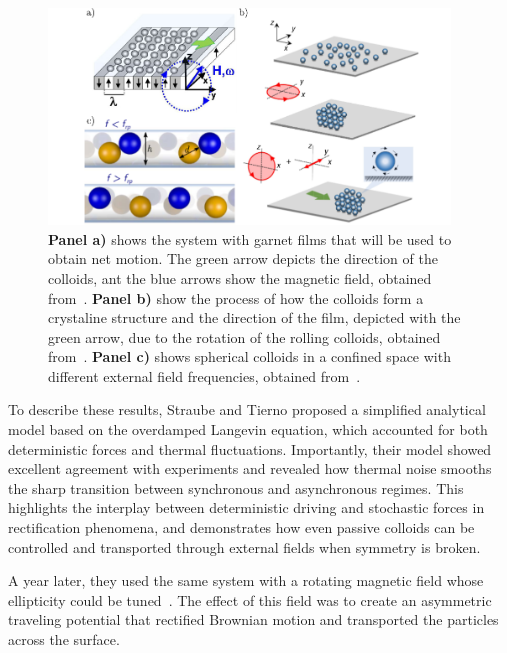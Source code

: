 \begin{figure}
  \begin{center}
    \includegraphics[width=0.95\textwidth]{figures/magneticallydrivencolloids.pdf}
  \end{center}
  \caption[Magnetically driven colloids examples.]{\textbf{Panel a)} shows the system with garnet films that will be used to obtain net motion. The green arrow depicts the direction of the colloids, ant the blue arrows show the magnetic field, obtained from~\cite{tierno2012depinning}. \textbf{Panel b)} show the process of how the colloids form a crystaline structure and the direction of the film, depicted with the green arrow, due to the rotation of the rolling colloids, obtained from~\cite{massana2019tunable}. \textbf{Panel c)} shows spherical colloids in a confined space with different external field frequencies, obtained from~\cite{massana2020emergent}.}\label{fig:magneticallydrivencolloidalsystems}
\end{figure}


To describe these results, Straube and Tierno proposed a simplified analytical model based on the overdamped Langevin equation, which accounted for both deterministic forces and thermal fluctuations. Importantly, their model showed excellent agreement with experiments and revealed how thermal noise smooths the sharp transition between synchronous and asynchronous regimes. This highlights the interplay between deterministic driving and stochastic forces in rectification phenomena, and demonstrates how even passive colloids can be controlled and transported through external fields when symmetry is broken.

A year later, they used the same system with a rotating magnetic field whose ellipticity could be tuned~\cite{straube2014tunable}. The effect of this field was to create an asymmetric traveling potential that rectified Brownian motion and transported the particles across the surface.

